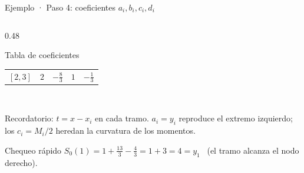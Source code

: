 \documentclass[aspectratio=169,10pt]{beamer}
\begin{document}
\begin{frame}{Ejemplo · Paso 4: coeficientes $a_i,b_i,c_i,d_i$}
\begin{columns}[T]
\begin{column}{0.48\textwidth}
\begin{cardgear}{Tabla de coeficientes}{\faTable}
{\begin{tabular}{c|cccc}
$[2,3]$ & $2$ & $-\tfrac83$ & $1$ & $-\tfrac13$\\
\end{tabular}}\\[1.6mm]
\raggedright
{\footnotesize Recordatorio: $t=x-x_i$ en cada tramo. $a_i=y_i$ reproduce el extremo izquierdo; los $c_i=M_i/2$ heredan la curvatura de los momentos.}
\end{cardgear}
\vspace{1mm}
\begin{cardnota}[\faInfoCircle]
{\footnotesize Chequeo rápido $S_0(1)=1+\tfrac{13}{3}-\tfrac43=1+3=4=y_1$ \checkmark\ (el tramo alcanza el nodo derecho).}
\end{cardnota}
\end{column}
\end{columns}
\end{frame}
\end{document}
